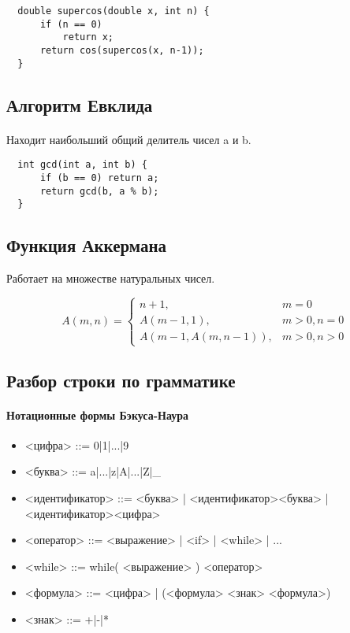 \documentclass{article}
\begin{document}
\begin{lstlisting}
  double supercos(double x, int n) {
      if (n == 0)
          return x;
      return cos(supercos(x, n-1));
  }
\end{lstlisting}

\subsection{Алгоритм Евклида}
\paragraph{}

Находит наибольший общий делитель чисел a и b.

\begin{lstlisting}
  int gcd(int a, int b) {
      if (b == 0) return a;
      return gcd(b, a % b);
  }
\end{lstlisting}

\subsection{Функция Аккермана}

Работает на множестве натуральных чисел.

\begin{equation*}
  A(m, n) =
  \begin{cases}
    n + 1, & m = 0\\
    A(m - 1, 1), & m > 0, n = 0\\
    A(m - 1, A(m, n - 1)), & m > 0, n > 0
  \end{cases}  
\end{equation*}

\subsection{Разбор строки по грамматике}
\paragraph{Нотационные формы Бэкуса-Наура}
\begin{itemize}
\item
  <цифра> ::= 0|1|...|9
\item
  <буква> ::= a|...|z|A|...|Z|\_
\item
  <идентификатор> ::= <буква> | <идентификатор><буква> | <идентификатор><цифра>
\item
  <оператор> ::= <выражение> | <if> | <while> | ...
\item
  <while> ::= while( <выражение> ) <оператор>
\item
  <формула> ::= <цифра> | (<формула> <знак> <формула>)
\item
  <знак> ::= +|-|*
\end{itemize}
\end{document}
